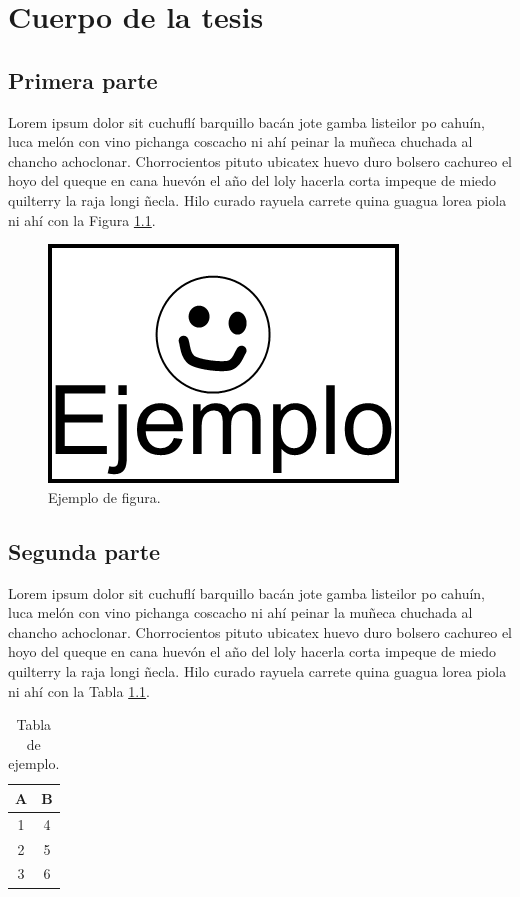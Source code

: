 \chapter{Cuerpo de la tesis}
\label{cap:cuerpo}

\section{Primera parte}
\label{sec:primera}

Lorem ipsum dolor sit cuchuflí barquillo bacán jote gamba listeilor po cahuín, luca melón con vino pichanga coscacho ni ahí peinar la muñeca chuchada al chancho achoclonar. Chorrocientos pituto ubicatex huevo duro bolsero cachureo el hoyo del queque en cana huevón el año del loly hacerla corta impeque de miedo quilterry la raja longi ñecla. Hilo curado rayuela carrete quina guagua lorea piola ni ahí con la Figura \ref{fig:ejemplo}.

\begin{figure}[!ht]
	\centering
	\includegraphics[scale=0.6]{images/Ejemplo.png}
	\caption{Ejemplo de figura.}
	\label{fig:ejemplo}
\end{figure}

\section{Segunda parte}
\label{sec:segunda}

Lorem ipsum dolor sit cuchuflí barquillo bacán jote gamba listeilor po cahuín, luca melón con vino pichanga coscacho ni ahí peinar la muñeca chuchada al chancho achoclonar. Chorrocientos pituto ubicatex huevo duro bolsero cachureo el hoyo del queque en cana huevón el año del loly hacerla corta impeque de miedo quilterry la raja longi ñecla. Hilo curado rayuela carrete quina guagua lorea piola ni ahí con la Tabla \ref{tab:ejemplo}.

\begin{table}[!ht]
	\centering
	\caption{Tabla de ejemplo.}
	\begin{tabular}{| c | c |}
		\hline
		A & B \\ \hline
		1 & 4 \\
		2 & 5 \\
		3 & 6 \\\hline
	\end{tabular}
	\label{tab:ejemplo}
\end{table}

